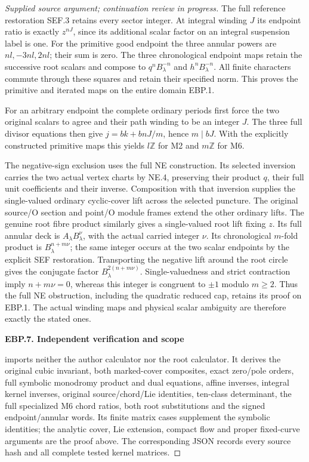 \begin{proof}[Supplied source argument; continuation review in progress]
The full reference restoration SEF.3 retains every sector integer.
At integral winding \(J\) its endpoint ratio is exactly
\(z^{nJ}\), since its additional scalar factor on an integral
suspension label is one. For the primitive good endpoint the three
annular powers are \(nl,-3nl,2nl\); their sum is zero. The three
chronological endpoint maps retain the successive root scalars and
compose to \(q^nB_\lambda^{-n}\) and \(h^nB_\lambda^{-n}\).
All finite characters commute through these squares and retain their
specified norm. This proves the primitive and iterated maps on the
entire domain EBP.1.

For an arbitrary endpoint the complete ordinary periods first force
the two original scalars to agree and their path winding to be an
integer \(J\). The three full divisor equations then give
\(j=bk+bnJ/m\), hence \(m\mid bJ\). With the explicitly
constructed primitive maps this yields \(l\mathbb Z\) for M2
and \(m\mathbb Z\) for M6.

The negative-sign exclusion uses the full NE construction. Its selected
inversion carries the two actual vertex charts by NE.4, preserving
their product \(q\), their full unit coefficients and their inverse.
Composition with that inversion supplies the single-valued ordinary
cyclic-cover lift across the selected puncture. The original source/O
section and point/O module frames extend the other ordinary lifts.
The genuine root fibre product similarly gives a single-valued root
lift fixing \(z\). Its full annular deck is
\(A_\lambda B_\lambda^\nu\), with the actual carried integer
\(\nu\). Its chronological \(m\)-fold product is
\(B_\lambda^{n+m\nu}\); the same integer occurs at the two
scalar endpoints by the explicit SEF restoration.
Transporting the negative lift around the root circle gives the
conjugate factor \(B_\lambda^{2(n+m\nu)}\). Single-valuedness
and strict contraction imply \(n+m\nu=0\), whereas this integer
is congruent to \(\pm1\) modulo \(m\ge2\). Thus the full NE
obstruction, including the quadratic reduced cap, retains its proof
on EBP.1. The actual winding maps and physical scalar ambiguity are
therefore exactly the stated ones.

\par

\medskip\noindent\textbf{EBP.7. Independent verification and scope}

\par\nobreak

 imports neither the
author calculator nor the root calculator. It derives the original
cubic invariant, both marked-cover composites, exact zero/pole orders,
full symbolic monodromy product and dual equations, affine inverses,
integral kernel inverses, original source/chord/Lie identities,
ten-class determinant, the full specialized M6 chord ratios, both
root substitutions and the signed endpoint/annular words. Its finite
matrix cases supplement the symbolic identities; the analytic cover,
Lie extension, compact flow and proper fixed-curve arguments are the
proof above. The corresponding JSON records every source hash and
all complete tested kernel matrices.


\end{proof}
